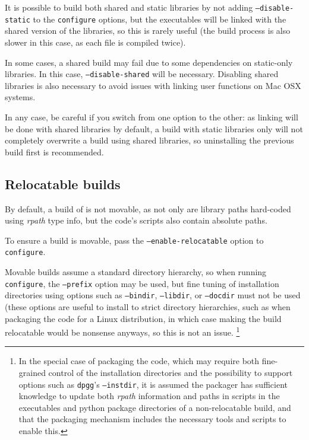 \documentclass[a4paper,10pt,twoside]{csshortdoc}
\begin{document}
It is possible to build both shared and static libraries by not adding
{\tt --disable-static} to the {\tt configure} options, but the
executables will be linked with the shared version of the libraries,
so this is rarely useful (the build process is also slower in this case, as
each file is compiled twice).

In some cases, a shared build may fail due to some dependencies
on static-only libraries. In this case, {\tt --disable-shared}
will be necessary. Disabling shared libraries is also necessary
to avoid issues with linking user functions on Mac OSX systems.

In any case, be careful if you switch from one option to the other: as
linking will be done with shared libraries by default, a build
with static libraries only will not completely overwrite a build using
shared libraries, so uninstalling the previous build first
is recommended.

\subsection{Relocatable builds\label{sec:config:relocatable}}

By default, a build of \CS is not movable, as not only
are library paths hard-coded using \emph{rpath} type info,
but the code's scripts also contain absolute paths.

To ensure a build is movable, pass the \texttt{--enable-relocatable} option
to {\tt configure}.

Movable builds assume a standard directory hierarchy, so when running
{\tt configure}, the \texttt{--prefix} option may be used, but fine tuning
of installation directories using options such as \texttt{--bindir},
\texttt{--libdir}, or \texttt{--docdir} must not be used
(these options are useful to install to strict directory hierarchies,
such as when packaging the code for a Linux distribution,
in which case making the build relocatable would be nonsense anyways,
so this is not an issue.
\footnote{In the special case of packaging the code, which
may require both fine-grained control of the installation directories
and the possibility to support options such as \texttt{dpgg}'s
\texttt{--instdir}, it is assumed the packager has sufficient knowledge to
update both \emph{rpath} information and paths in scripts in the executables
and python package directories of a non-relocatable build, and that the
packaging mechanism includes the necessary tools and scripts to enable this.}
\end{document}
